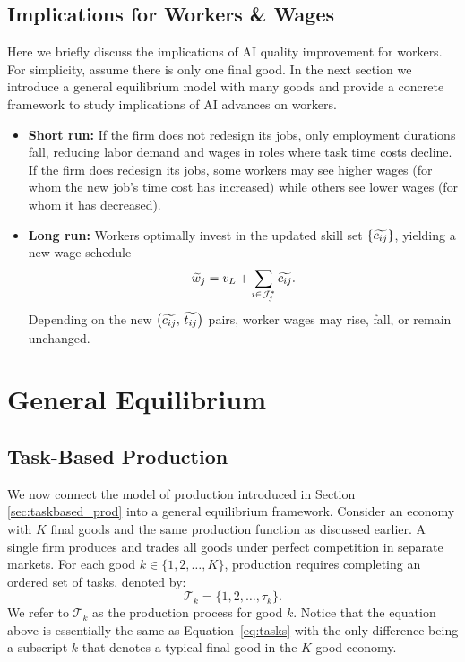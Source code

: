 \documentclass{article}
\theoremstyle{plain}
\theoremstyle{plain}
\begin{document}
\subsection{Implications for Workers \& Wages}

Here we briefly discuss the implications of AI quality improvement for workers.
For simplicity, assume there is only one final good.
In the next section we introduce a general equilibrium model with many goods and provide a concrete framework to study implications of AI advances on workers.

\begin{itemize}
  \item \textbf{Short run:}  
    If the firm does not redesign its jobs, only employment durations fall, reducing labor demand and wages in roles where task time costs decline.  
    If the firm does redesign its jobs, some workers may see higher wages (for whom the new job’s time cost has increased) while others see lower wages (for whom it has decreased).

  \item \textbf{Long run:}  
    Workers optimally invest in the updated skill set $\{\widetilde{c_{ij}}\}$, yielding a new wage schedule
    \[
      \widetilde{w}_j = v_L + \sum_{i\in\mathcal{J}_j^*} \widetilde{c_{ij}}.
    \]
    Depending on the new 
    $\bigl(\widetilde{c_{ij}},\,\widetilde{t_{ij}}\bigr)$
    pairs, worker wages may rise, fall, or remain unchanged.
\end{itemize}




\section{General Equilibrium}
\label{sec:GE}

\subsection{Task-Based Production}
\label{sec:prod_GE}

We now connect the model of production introduced in Section \ref{sec:taskbased_prod} into a general equilibrium framework.
Consider an economy with $K$ final goods and the same production function as discussed earlier.
A single firm produces and trades all goods under perfect competition in separate markets.
For each good $k \in \{1, 2,\ldots,K\}$, production requires completing an ordered set of tasks, denoted by:
\[
\mathcal{T}_k = \{1,2,\ldots,\tau_k\}.
\]
We refer to $\mathcal{T}_k$ as the production process for good $k$.
Notice that the equation above is essentially the same as Equation~\ref{eq:tasks} with the only difference being a subscript $k$ that denotes a typical final good in the $K$-good economy.
\end{document}

